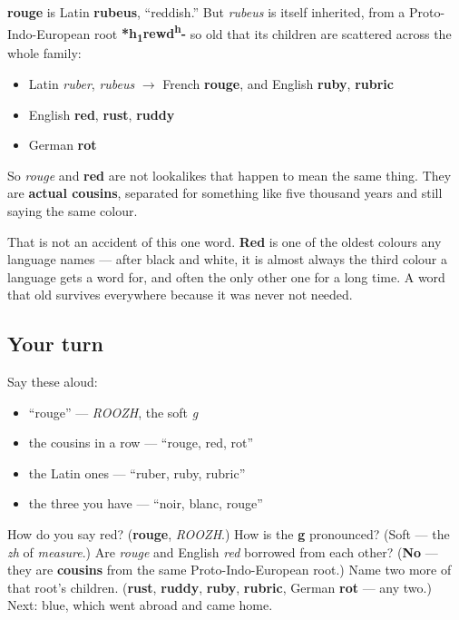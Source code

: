 \begin{cousinweb}
\textbf{rouge} is Latin \textbf{rubeus}, \textquotedblleft{}reddish.\textquotedblright{} But \emph{rubeus} is itself inherited, from a Proto-Indo-European root \textbf{*h\textsubscript{1}rewd\textsuperscript{h}-} so old that its children are scattered across the whole family:

\begin{itemize}
\raggedright
  \item Latin \emph{ruber}, \emph{rubeus} $\to$ French \textbf{rouge}, and English \textbf{ruby}, \textbf{rubric}
  \item English \textbf{red}, \textbf{rust}, \textbf{ruddy}
  \item German \textbf{rot}
\end{itemize}

So \emph{rouge} and \textbf{red} are not lookalikes that happen to mean the same thing. They are \textbf{actual cousins}, separated for something like five thousand years and still saying the same colour.

That is not an accident of this one word. \textbf{Red} is one of the oldest colours any language names — after black and white, it is almost always the third colour a language gets a word for, and often the only other one for a long time. A word that old survives everywhere because it was never not needed.
\end{cousinweb}

\subsection*{Your turn}
Say these aloud:

\begin{itemize}
\raggedright
  \item \textquotedblleft{}rouge\textquotedblright{} — \emph{ROOZH}, the soft \emph{g}
  \item the cousins in a row — \textquotedblleft{}rouge, red, rot\textquotedblright{}
  \item the Latin ones — \textquotedblleft{}ruber, ruby, rubric\textquotedblright{}
  \item the three you have — \textquotedblleft{}noir, blanc, rouge\textquotedblright{}
\end{itemize}

\begin{tcolorbox}[breakable,colback=teal!4,colframe=teal!35!black,title={Before you move on}]
How do you say red? (\textbf{rouge}, \emph{ROOZH}.) How is the \textbf{g} pronounced? (Soft — the \emph{zh} of \emph{measure}.) Are \emph{rouge} and English \emph{red} borrowed from each other? (\textbf{No} — they are \textbf{cousins} from the same Proto-Indo-European root.) Name two more of that root's children. (\textbf{rust}, \textbf{ruddy}, \textbf{ruby}, \textbf{rubric}, German \textbf{rot} — any two.) Next: blue, which went abroad and came home.
\end{tcolorbox}
